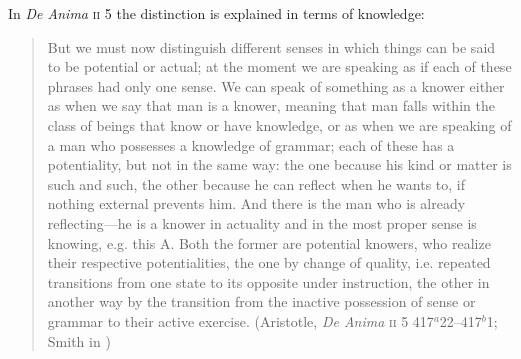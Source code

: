 In \emph{De Anima} \textsc{ii} 5 the distinction is explained in terms of knowledge:
\begin{quote}
	But we must now distinguish different senses in which things can be said to be potential or actual; at the moment we are speaking as if each of these phrases had only one sense. We can speak of something as a knower either as when we say that man is a knower, meaning that man falls within the class of beings that know or have knowledge, or as when we are speaking of a man who possesses a knowledge of grammar; each of these has a potentiality, but not in the same way: the one because his kind or matter is such and such, the other because he can reflect when he wants to, if nothing external prevents him. And there is the man who is already reflecting---he is a knower in actuality and in the most proper sense is knowing, e.g. this A. Both the former are potential knowers, who realize their respective potentialities, the one by change of quality, i.e. repeated transitions from one state to its opposite under instruction, the other in another way by the transition from the inactive possession of sense or grammar to their active exercise. (Aristotle, \emph{De Anima} \textsc{ii} 5 417\( ^{a} \)22--417\( ^{b} \)1; Smith in \citealt[30]{Barnes:1984uq})
\end{quote}

